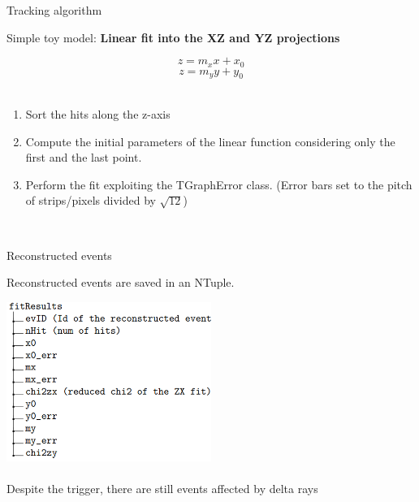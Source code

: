\documentclass[8pt]{beamer}
\begin{document}
\begin{frame}{Tracking algorithm}
\begin{center}
    Simple toy model: \textbf{Linear fit into the XZ and YZ projections}
\end{center}

$$z=m_x x +x_0$$
$$z=m_y y + y_0$$
\\
\vspace{0.5cm}
\begin{enumerate}
    \item Sort the hits along the z-axis
    \item Compute the initial parameters of the linear function considering only the first and the last point.
    \item Perform the fit exploiting the TGraphError class. (Error bars set to the pitch of strips/pixels divided by $\sqrt{12}$)
\end{enumerate}
\\
    
\end{frame}

\begin{frame}{Reconstructed events}
    
Reconstructed events are saved in an NTuple.
    
\begin{center}
           \includegraphics[width=0.5\textwidth]{img/fitres.png}
           \\
           \vspace{0.4cm}
           \\
           \vspace{0.2cm}
           Despite the trigger, there are still events affected by delta rays
\end{center}


    
    
\end{frame}
\end{document}
